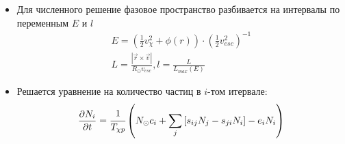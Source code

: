 \begin{itemize}
	\item Для численного решение фазовое пространство разбивается на интервалы по переменным $E$ и $l$
	\begin{equation*}
		\begin{split}
			E = \left(\frac{1}{2} v_{\chi}^2 + \phi(r)\right)\cdot
			\left(\frac{1}{2} v_{esc}^2 \right)^{-1} \\
			L = \frac{|\vec{r} \times \vec{v}|}
			{R_{\odot} v_{esc}}, l = \frac{L}{L_{max}(E)}
		\end{split}
	\end{equation*}
	\item Решается уравнение на количество частиц в $i$-том итервале:
	\begin{equation*}
		\frac{\partial N_{i}}{\partial t} = \cfrac{1}{T_{\chi p}} \left(N_{\odot} c_i +
		\sum_j{[s_{ij} N_{j} - s_{ji} N_{i} ]} - e_{i} N_i  \right)
	\end{equation*}
\end{itemize}